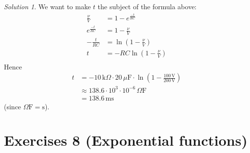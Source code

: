 \documentclass[
  english,
  12pt,
  oneside]{book}
\theoremstyle{definition}
\theoremstyle{definition}
\theoremstyle{definition}
\theoremstyle{definition}
\theoremstyle{remark}
\newtheorem*{solution}{Solution}
\begin{document}
\begin{solution}
We want to make \(t\) the subject of the formula above:
\begin{align*}
\frac{\nu}{V} &=1-e^{\frac{-t}{RC}}\\
e^{\frac{-t}{RC}} &= 1-\frac{\nu}{V}\\
-\frac{t}{RC} &= \ln\left(1-\frac{\nu}{V}\right)\\
t &= -RC\ln\left(1-\frac{\nu}{V}\right)\\
\end{align*}
Hence
\begin{align*}
t&=-10\,\mathrm{k}\Omega\cdot 20\,\mu\mathrm{F}\cdot \ln\left(1-\frac{100\,\mathrm{V}}{200\,\mathrm{V}}\right)\\
&\approx 138.6\cdot 10^3\cdot 10^{-6} \,\Omega\mathrm{F}\\
&= 138.6 \,\mathrm{ms}
\end{align*}
(since \(\Omega\mathrm{F} = \mathrm{s}\)).
\end{solution}

\chapter*{Exercises 8 (Exponential functions)}\label{exercises-8-exponential-functions}
\end{document}
